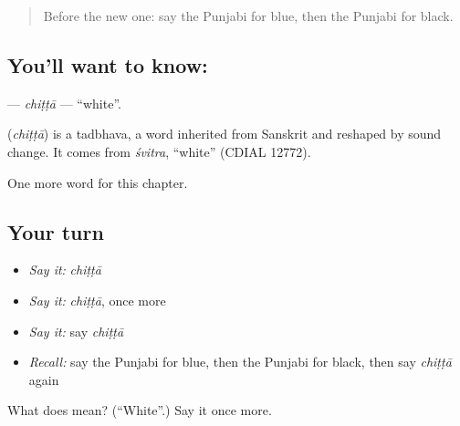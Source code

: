 \label{lesson:PA-C84-chitta}



\begin{quote}
Before the new one: say the Punjabi for blue, then the Punjabi for black.
\end{quote}

\subsection*{You'll want to know: }
\textbf{} — \emph{chiṭṭā} — \textquotedblleft{}white\textquotedblright{}.

\begin{cousinweb}
\textbf{} (\emph{chiṭṭā}) is a tadbhava, a word inherited from Sanskrit and reshaped by sound change. It comes from \emph{śvitra}, \textquotedblleft{}white\textquotedblright{} (CDIAL 12772).
\end{cousinweb}

\begin{grammarlens}[title={What you've built}]
One more word for this chapter.
\end{grammarlens}

\subsection*{Your turn}
\begin{itemize}
\raggedright
  \item \emph{Say it:} \emph{chiṭṭā}
  \item \emph{Say it:} \emph{chiṭṭā}, once more
  \item \emph{Say it:} say \emph{chiṭṭā}
  \item \emph{Recall:} say the Punjabi for blue, then the Punjabi for black, then say \emph{chiṭṭā} again
\end{itemize}

\begin{tcolorbox}[breakable,colback=teal!4,colframe=teal!35!black,title={Before you move on}]
What does  mean? (\textquotedblleft{}White\textquotedblright{}.) Say it once more.
\end{tcolorbox}
